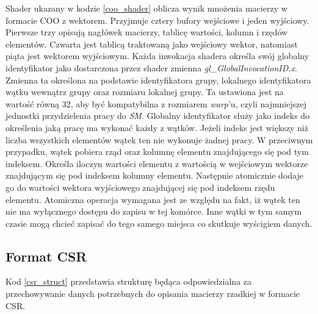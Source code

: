 Shader ukazany w kodzie \ref{coo_shader} oblicza wynik mnożenia macierzy w formacie COO z wektorem.
Przyjmuje cztery bufory wejściowe i jeden wyjściowy.
Pierwsze trzy opisują nagłówek macierzy, tablicę wartości, kolumn i rzędów elementów.
Czwarta jest tablicą traktowaną jako wejściowy wektor, natomiast piąta jest wektorem wyjściowym. 
Każda inwokacja shadera określa swój globalny identyfikator jako dostarczona przez shader zmienna \textit{gl\_GlobalInvocationID.x}.
Zmienna ta określona na podstawie identyfikatora grupy, lokalnego identyfikatora wątku wewnątrz grupy oraz rozmiaru lokalnej grupy.
Ta ustawiona jest na wartość równą 32, aby być kompatybilna z rozmiarem \textit{warp}'u, czyli najmniejszej jednostki przydzielenia pracy do \textit{SM}.
Globalny identyfikator służy jako indeks do określenia jaką pracę ma wykonać każdy z wątków.
Jeżeli indeks jest większy niż liczba wszystkich elementów wątek ten nie wykonuje żadnej pracy.
W przeciwnym przypadku, wątek pobiera rząd oraz kolumnę elementu znajdującego się pod tym indeksem.
Określa iloczyn wartości elementu z wartością w wejściowym wektorze znajdującym się pod indeksem kolumny elementu.
Następnie atomicznie dodaje go do wartości wektora wyjściowego znajdującej się pod indeksem rzędu elementu.
Atomiczna operacja wymagana jest ze względu na fakt, iż wątek ten nie ma wyłącznego dostępu do zapisu w tej komórce.
Inne wątki w tym samym czasie mogą chcieć zapisać do tego samego miejsca co skutkuje wyścigiem danych.

\subsection{Format CSR}
\label{cha:csr_impl}

Kod \ref{csr_struct} przedstawia strukturę będąca odpowiedzialna za przechowywanie danych potrzebnych do opisania macierzy rzadkiej w formacie CSR.


